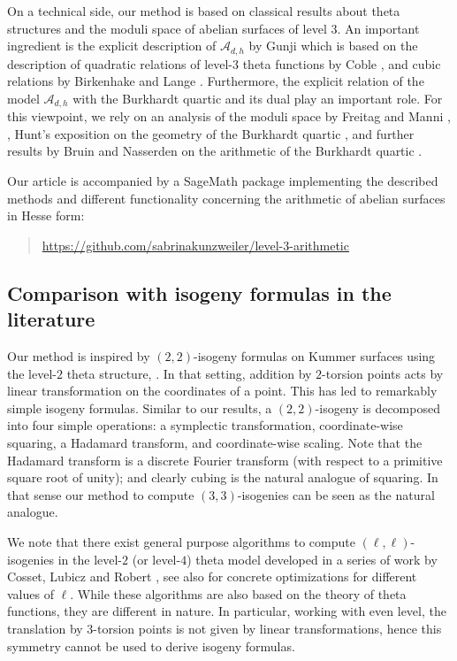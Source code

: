 \documentclass[11pt]{amsart}
\theoremstyle{definition}
\newcommand{\A}{\mathcal{A}}
\begin{document}
On a technical side, our method is based on classical results about theta structures and the moduli space of abelian surfaces of level $3$. An important ingredient is the explicit description of $\A_{d,h}$ by Gunji \cite{gunji2006defining} which is based on the description of quadratic relations of level-$3$ theta functions by Coble \cite{coble1917point}, and cubic relations by Birkenhake and Lange \cite{birkenhake1990cubic}. Furthermore, the explicit relation of the model $\A_{d,h}$ with the Burkhardt quartic and its dual play an important role. For this viewpoint, we rely on an analysis of the moduli space by Freitag and Manni \cite{freitag2004burkhardt1}, \cite{freitag2004burkhardt2},  Hunt's exposition on the geometry of the Burkhardt quartic \cite{hunt2006burkhardt}, and further results by Bruin and Nasserden on the arithmetic of the Burkhardt quartic  \cite{bruin2018arithmetic}.

Our article is accompanied by a SageMath \cite{sagemath} package implementing the described methods and different functionality concerning the arithmetic of abelian surfaces in Hesse form:
\begin{quote}
    \url{https://github.com/sabrinakunzweiler/level-3-arithmetic}
\end{quote}


\subsection{Comparison with isogeny formulas in the literature}

Our method is inspired by $(2,2)$-isogeny formulas on Kummer surfaces using the level-$2$ theta structure, \cite{gaudry2007fast,damien-notes,level-2-theta-dimension-2}. In that setting, addition by $2$-torsion points acts by linear transformation on the coordinates of a point. This has led to remarkably simple isogeny formulas. Similar to our results, a $(2,2)$-isogeny is decomposed into four simple operations: a symplectic transformation, coordinate-wise squaring, a Hadamard transform, and coordinate-wise scaling. Note that the Hadamard transform is a discrete Fourier transform (with respect to a primitive square root of unity); and clearly cubing is the natural analogue of squaring. In that sense our method to compute $(3,3)$-isogenies can be seen as the natural analogue.

We note that there exist general purpose algorithms to compute $(\ell,\ell)$-isogenies in the level-$2$ (or level-$4$) theta model developed in a series of work by Cosset, Lubicz and Robert \cite{lubicz2012computing,cosset2015computing,lubicz2023fast}, see also \cite{yoshizumi2025efficient} for concrete optimizations for different values of $\ell$. While these algorithms are also based on the theory of theta functions, they are different in nature. In particular, working with even level, the translation by $3$-torsion points is not given by linear transformations, hence this symmetry cannot be used to derive isogeny formulas.
\end{document}
